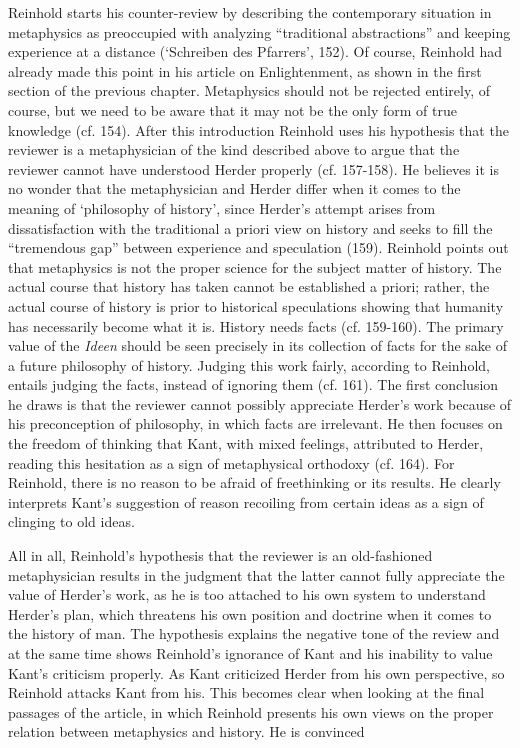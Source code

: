  Reinhold starts his counter{-}review by describing the contemporary situation in metaphysics as preoccupied with analyzing ``traditional abstractions'' and keeping experience at a distance (`Schreiben des Pfarrers', 152). Of course, Reinhold had already made this point in his article on Enlightenment, as shown in the first section of the previous chapter. Metaphysics should not be rejected entirely, of course, but we need to be aware that it may not be the only form of true knowledge (cf. 154). After this introduction Reinhold uses his hypothesis that the reviewer is a metaphysician of the kind described above to argue that the reviewer cannot have understood Herder properly (cf. 157{-}158). He believes it is no wonder that the metaphysician and Herder differ when it comes to the meaning of `philosophy of history', since Herder's attempt arises from dissatisfaction with the traditional a priori view on history and seeks to fill the ``tremendous gap'' between experience and speculation (159). Reinhold points out that metaphysics is not the proper science for the subject matter of history. The actual course that history has taken cannot be established a priori; rather, the actual course of history is prior to historical speculations showing that humanity has necessarily become what it is. History needs facts (cf. 159{-}160). The primary value of the \textit{Ideen }should be seen precisely in its collection of facts for the sake of a future philosophy of history. Judging this work fairly, according to Reinhold, entails judging the facts, instead of ignoring them (cf. 161). The first conclusion he draws is that the reviewer cannot possibly appreciate Herder's work because of his preconception of philosophy, in which facts are irrelevant. He then focuses on the freedom of thinking that Kant, with mixed feelings, attributed to Herder, reading this hesitation as a sign of metaphysical orthodoxy (cf. 164). For Reinhold, there is no reason to be afraid of freethinking or its results. He clearly interprets Kant's suggestion of reason recoiling from certain ideas as a sign of clinging to old ideas. 

All in all, Reinhold's hypothesis that the reviewer is an old{-}fashioned metaphysician results in the judgment that the latter cannot fully appreciate the value of Herder's work, as he is too attached to his own system to understand Herder's plan, which threatens his own position and doctrine when it comes to the history of man. The hypothesis explains the negative tone of the review and at the same time shows Reinhold's ignorance of Kant and his inability to value Kant's criticism properly. As Kant criticized Herder from his own perspective, so Reinhold attacks Kant from his. This becomes clear when looking at the final passages of the article, in which Reinhold presents his own views on the proper relation between metaphysics and history. He is convinced 

